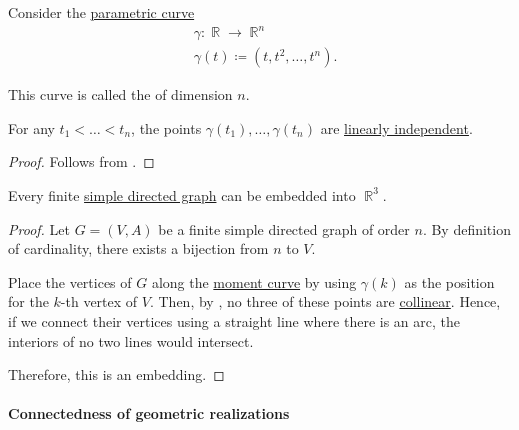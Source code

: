 \begin{proposition}\label{thm:moment_curve}
  Consider the \hyperref[def:parametric_curve]{parametric curve}
  \begin{equation*}
    \begin{aligned}
      &\gamma: \BbbR \to \BbbR^n \\
      &\gamma(t) \coloneqq (t, t^2, \ldots, t^n).
    \end{aligned}
  \end{equation*}

  This curve is called the  of dimension \( n \).

  For any \( t_1 < \ldots < t_n \), the points \( \gamma(t_1), \ldots, \gamma(t_n) \) are \hyperref[def:linear_dependence]{linearly independent}.
\end{proposition}
\begin{proof}
  Follows from .
\end{proof}

\begin{proposition}\label{thm:directed_multigraph_can_be_embedded_into_r3}
  Every finite \hyperref[def:directed_graph]{simple directed graph} can be embedded into \( \BbbR^3 \).
\end{proposition}
\begin{proof}
  Let \( G = (V, A) \) be a finite simple directed graph of order \( n \). By definition of cardinality, there exists a bijection from \( n \) to \( V \).

  Place the vertices of \( G \) along the \hyperref[thm:moment_curve]{moment curve} by using \( \gamma(k) \) as the position for the \( k \)-th vertex of \( V \). Then, by , no three of these points are \hyperref[def:collinear_points]{collinear}. Hence, if we connect their vertices using a straight line where there is an arc, the interiors of no two lines would intersect.

  Therefore, this is an embedding.
\end{proof}

\paragraph{Connectedness of geometric realizations}


